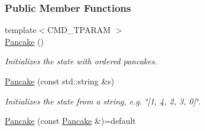 \subsubsection*{Public Member Functions}
\begin{DoxyCompactItemize}
\item 
{\footnotesize template$<$C\+M\+D\+\_\+\+T\+P\+A\+R\+AM $>$ }\\\hyperlink{structslb_1_1ext_1_1domain_1_1pancake_1_1Pancake_a47635a60ee6db4d43ed5a8f7143b957d}{Pancake} ()
\begin{DoxyCompactList}\small\item\em Initializes the state with ordered pancakes. \end{DoxyCompactList}\item 
\hyperlink{structslb_1_1ext_1_1domain_1_1pancake_1_1Pancake_a3ed4615ca5f18688218860e76969ae0e}{Pancake} (const std\+::string \&s)
\begin{DoxyCompactList}\small\item\em Initializes the state from a string, e.\+g. \char`\"{}\mbox{[}1, 4, 2, 3, 0\mbox{]}\char`\"{}. \end{DoxyCompactList}\item 
\hyperlink{structslb_1_1ext_1_1domain_1_1pancake_1_1Pancake_a9db0e3d98c5a51d65f36a52692ddf2d8}{Pancake} (const \hyperlink{structslb_1_1ext_1_1domain_1_1pancake_1_1Pancake}{Pancake} \&)=default\hypertarget{structslb_1_1ext_1_1domain_1_1pancake_1_1Pancake_a9db0e3d98c5a51d65f36a52692ddf2d8}{}\label{structslb_1_1ext_1_1domain_1_1pancake_1_1Pancake_a9db0e3d98c5a51d65f36a52692ddf2d8}


\end{DoxyCompactItemize}

